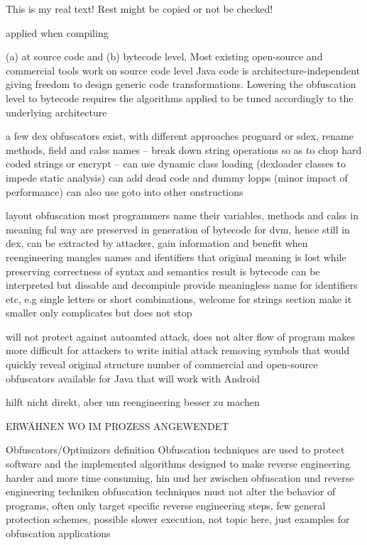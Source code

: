 This is my real text! Rest might be copied or not be checked!

applied when compiling

%
(a) at source code and (b) bytecode level, Most existing open-source and commercial tools work on source code level\newline
Java code is architecture-independent giving freedom to design generic code transformations. Lowering the obfuscation level to bytecode requires the algorithms applied to be tuned accordingly to the underlying architecture\newline
\cite{kovachevaMaster}
%

%
a few dex obfuscators exist, with different approaches
proguard or sdex, rename methods, field and calss names -- break down string operations so as to chop hard coded strings or encrypt -- can use dynamic class loading (dexloader classes to impede static analysis)
can add dead code and dummy lopps (minor impact of performance)
can also use goto into other onstructions

\cite{andevconDalvikART}
%


%

layout obfuscation
most programmers name their variables, methods and calss in meaning ful way
are preserved in generation of bytecode for dvm, hence still in dex, can be extracted by attacker, gain information and benefit when reengineering
mangles names and ifentifiers that original meaning is lost while preserving correctness of syntax and semantics
result is bytecode can be interpreted but dissable and decompiule provide meaningless name for identifiers etc, e.g single letters or short combinations, welcome for strings section make it smaller
only complicates but does not stop


\cite{munteanLicense}
%

%
will not protect against autoamted attack, does not alter flow of program
makes more difficult for attackers to write initial attack
removing symbols that would quickly reveal original structure
number of commercial and open-source obfuscators available for Java that will work with Android
\cite{developersSecuring}
%

hilft nicht direkt, aber um reengineering besser zu machen

ERWÄHNEN WO IM PROZESS ANGEWENDET\newline


Obfuscators/Optimizors definition\newline
Obfuscation techniques are used to protect software and the implemented algorithms\newline
designed to make reverse engineering harder and more time consuming, hin und her zwischen obfuscation und reverse engineering techniken\newline
obfuscation techniques must not alter the behavior of programs, often only target specific reverse engineering steps, few general protection schemes, possible slower execution, not topic here, just examples for obfuscation applications

